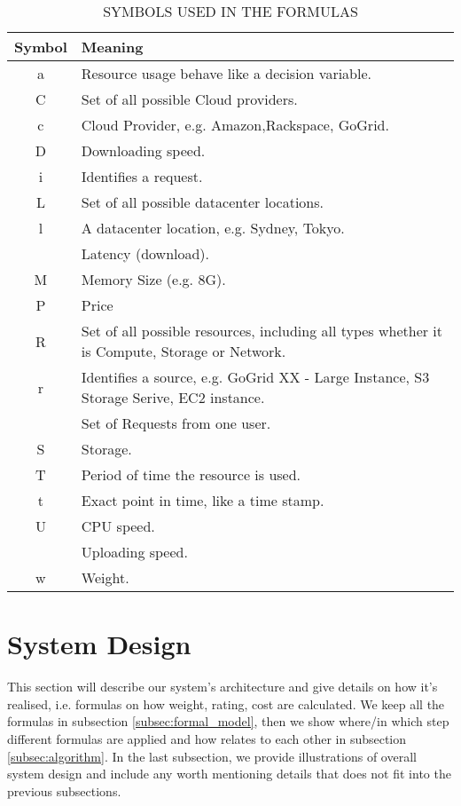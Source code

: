\documentclass[journal]{IEEEtran}
\begin{document}
\begin{table}[!h]
\begin{center}\caption{SYMBOLS USED IN THE FORMULAS} \label{table:formula_symbols}
\begin{tabular}{|c|p{6cm}|}
\hline
\textbf{Symbol }&  \textbf{Meaning  }  \\
\hline a & Resource usage behave like a decision variable. \\
\hline C & Set of all possible Cloud providers. \\
\hline c & Cloud Provider, e.g. Amazon,Rackspace, GoGrid. \\
\hline D & Downloading speed. \\
\hline i & Identifies a request. \\
\hline L & Set of all possible datacenter locations. \\
\hline l & A datacenter location, e.g. Sydney, Tokyo. \\
\hline  & Latency (download). \\
\hline  M & Memory Size (e.g. 8G). \\
\hline  P & Price \\
\hline  R & Set of all possible resources, including all types whether it is Compute, Storage or Network.\\
\hline  r & Identifies a source, e.g. GoGrid XX - Large Instance, S3 Storage Serive, EC2 instance.\\
\hline  &  Set of Requests from one user. \\
\hline  S & Storage. \\
\hline  T & Period of time the resource is used. \\
\hline  t & Exact point in time, like a time stamp. \\
\hline  U & CPU speed. \\
\hline  & Uploading speed. \\
\hline w & Weight. \\
\hline
\end{tabular}
\end{center}
\end{table}

\section{System Design}\label{model}

This section will describe our system's architecture and give details on how it's realised, i.e. formulas on how weight, rating, cost are calculated. We keep all the formulas in subsection \ref{subsec:formal_model}, then we show where/in which step different formulas are applied and how relates to each other in subsection \ref{subsec:algorithm}. In the last subsection, we provide illustrations of overall system design and include any worth mentioning details that does not fit into the previous subsections.
\end{document}
